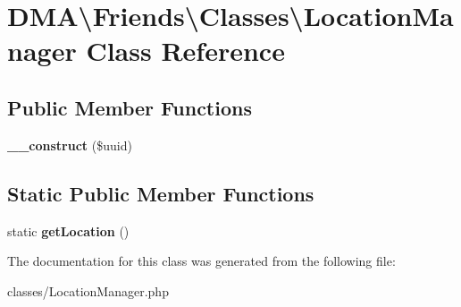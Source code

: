 \hypertarget{classDMA_1_1Friends_1_1Classes_1_1LocationManager}{}\section{D\+M\+A\textbackslash{}Friends\textbackslash{}Classes\textbackslash{}Location\+Manager Class Reference}
\label{classDMA_1_1Friends_1_1Classes_1_1LocationManager}
\subsection*{Public Member Functions}
\begin{DoxyCompactItemize}
\item 
\hypertarget{classDMA_1_1Friends_1_1Classes_1_1LocationManager_a96c818348ca79a9bdcfb61f522f18adc}{}{\bfseries \+\_\+\+\_\+construct} (\$uuid)\label{classDMA_1_1Friends_1_1Classes_1_1LocationManager_a96c818348ca79a9bdcfb61f522f18adc}

\end{DoxyCompactItemize}
\subsection*{Static Public Member Functions}
\begin{DoxyCompactItemize}
\item 
\hypertarget{classDMA_1_1Friends_1_1Classes_1_1LocationManager_a891ca42df61c88580aae3447d15e4bd7}{}static {\bfseries get\+Location} ()\label{classDMA_1_1Friends_1_1Classes_1_1LocationManager_a891ca42df61c88580aae3447d15e4bd7}

\end{DoxyCompactItemize}


The documentation for this class was generated from the following file\+:\begin{DoxyCompactItemize}
\item 
classes/Location\+Manager.\+php\end{DoxyCompactItemize}
